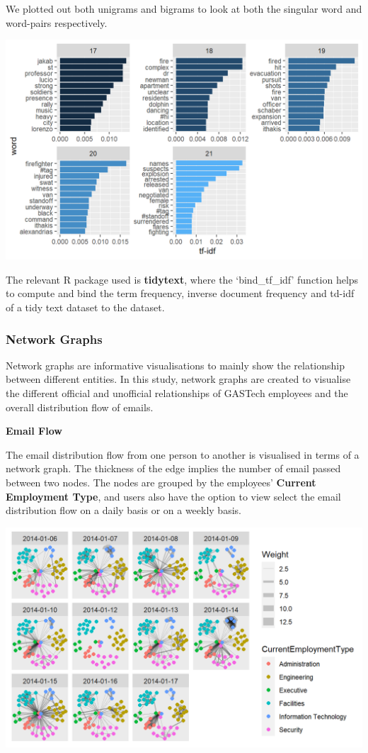 \documentclass{acm_proc_article-sp}
\begin{document}
We plotted out both unigrams and bigrams to look at both the singular
word and word-pairs respectively.

\includegraphics{img/image07.png}

The relevant R package used is \textbf{tidytext}, where the
`bind\_tf\_idf' function helps to compute and bind the term frequency,
inverse document frequency and td-idf of a tidy text dataset to the
dataset.

\hypertarget{network-graphs-1}{%
\subsubsection{Network Graphs}\label{network-graphs-1}}

Network graphs are informative visualisations to mainly show the
relationship between different entities. In this study, network graphs
are created to visualise the different official and unofficial
relationships of GASTech employees and the overall distribution flow of
emails.

\textbf{Email Flow}

The email distribution flow from one person to another is visualised in
terms of a network graph. The thickness of the edge implies the number
of email passed between two nodes. The nodes are grouped by the
employees' \textbf{Current Employment Type}, and users also have the
option to view select the email distribution flow on a daily basis or on
a weekly basis.

\includegraphics{img/image09.png}
\end{document}
